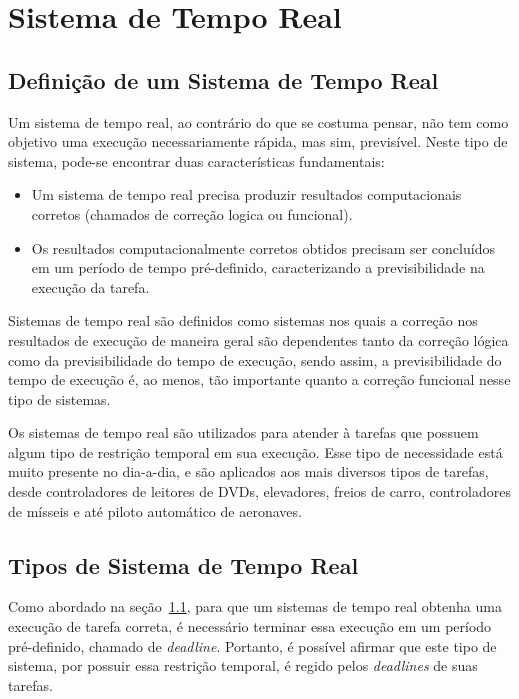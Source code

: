\section{Sistema de Tempo Real}
\label{sec:STR}

\subsection{Definição de um Sistema de Tempo Real}
\label{sec:DefSTR}
Um sistema de tempo real, ao contrário do que se costuma pensar, não tem
como objetivo uma execução necessariamente rápida, mas sim, previsível.
Neste tipo de sistema, pode-se encontrar duas características fundamentais:

\begin{itemize}
\item Um sistema de tempo real precisa produzir resultados computacionais corretos
(chamados de correção logica ou funcional).
\item Os resultados computacionalmente corretos obtidos precisam ser concluídos em
um período de tempo pré-definido, caracterizando a previsibilidade na execução da tarefa.
\end{itemize}

Sistemas de tempo real são definidos como sistemas nos quais a correção nos
resultados de execução de maneira geral são dependentes tanto da correção
lógica como da previsibilidade do tempo de execução, sendo assim, a previsibilidade
do tempo de execução é, ao menos, tão importante quanto a correção funcional
nesse tipo de sistemas.~\cite{Li:2003:RCE:829584}

Os sistemas de tempo real são utilizados para atender à tarefas que possuem algum tipo
de restrição temporal em sua execução. Esse tipo de necessidade está muito presente no
dia-a-dia, e são aplicados aos mais diversos tipos de tarefas, desde controladores de
leitores de DVDs, elevadores, freios de carro, controladores de mísseis e até piloto automático
de aeronaves.

\subsection{Tipos de Sistema de Tempo Real}
Como abordado na seção~\ref{sec:DefSTR}, para que um sistemas de tempo real obtenha uma
execução de tarefa correta, é necessário terminar essa execução em um período pré-definido,
chamado de \textit{deadline}. Portanto, é possível afirmar que este tipo de sistema, por possuir
essa restrição temporal, é regido pelos \textit{deadlines} de suas tarefas.

